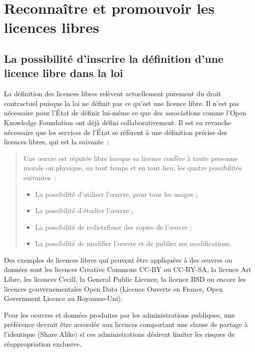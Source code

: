 \chapter{Reconnaître et promouvoir les licences libres}\label{licencelibre}

\section{La possibilité d'inscrire la définition d'une licence libre dans la loi}
La définition des licences libres relèvent actuellement purement du droit contractuel puisque la loi ne définit pas ce qu'est une licence libre. Il n'est pas nécessaire pour l'État de définir lui-même ce que des associations comme l'Open Knowledge Foundation ont déjà défini collaborativement. Il est en revanche nécessaire que les services de l'État se réfèrent à une définition précise des licences libres, qui est la suivante~:

\begin{quotation}
Une œuvre est réputée libre lorsque sa licence confère à toute personne morale ou physique, en tout temps et en tout lieu, les quatre possibilités suivantes~:
\begin{itemize}
\item La possibilité d'utiliser l'œuvre, pour tous les usages ;
\item La possibilité d'étudier l'œuvre ;
\item La possibilité de redistribuer des copies de l'œuvre ;
\item La possibilité de modifier l'œuvre et de publier ses modifications.
\end{itemize}
\end{quotation}

Des exemples de licences libres qui peuvent être appliquées à des œuvres ou données sont les licences Creative Commons CC-BY ou CC-BY-SA, la licence Art Libre, les licences Cecill, la General Public Licence, la licence BSD ou encore les licences gouvernementales Open Data (Licence Ouverte en France, Open Government Licence au Royaume-Uni). 

Pour les oeuvres et données produites par les administrations publiques, une préférence devrait être accordée aux licences comportant une clause de partage à l'identique (Share Alike) si ces administrations désirent limiter les risques de réappropriation exclusive. 


